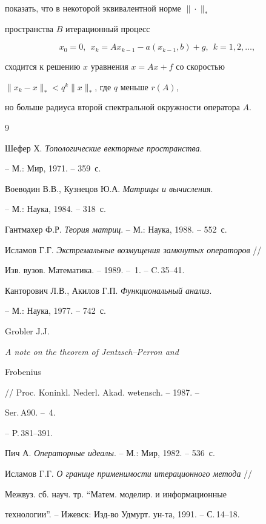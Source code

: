 показать, что в некоторой эквивалентной норме $\|\cdot\|_*$


пространства $B$ итерационный процесс


$$


x_0 = 0,\ \ x_k = Ax_{k-1} - a(x_{k-1},b) + g,\ \ k=1,2,\dotsc,


$$


сходится к решению $x$ уравнения $x = Ax + f$ со скоростью


$\|x_k - x \|_* < q^k \|x\|_*$, где $q$ меньше  $r(A)$, 


но больше радиуса второй спектральной окружности оператора $A$.








\begin{thebibliography}{9}







Шефер Х. {\em Топологические векторные пространства}. 


-- М.: Мир, 1971. -- 359~с.




Воеводин В.В., Кузнецов Ю.А. {\em Матрицы и вычисления}. 


-- М.: Наука, 1984. -- 318~с.




Гантмахер Ф.Р. {\em Теория матриц}. -- М.: Наука, 1988. -- 552~с.




Исламов Г.Г. {\em Экстремальные возмущения замкнутых операторов} // 


Изв. вузов. Математика. -- 1989. -- \No\,1. -- C.\,35--41.




Канторович Л.В., Акилов Г.П. {\em Функциональный анализ}. 


-- М.: Наука, 1977. -- 742~с.




Grobler J.J. {\em A note on the theorem of Jentzsch--Perron and 


Frobenius} // Proc. Koninkl. Nederl. Akad. wetensch. -- 1987. --


Ser.\,A90. -- \No\,4. 


-- P.\,381--391.




Пич А. {\em Операторные идеалы}. -- М.: Мир, 1982. -- 536~с.




Исламов Г.Г. {\em О границе применимости итерационного метода} //


Межвуз. сб. науч. тр. ``Матем. моделир. и информационные


технологии''. -- Ижевск: Изд-во Удмурт. ун-та, 1991. -- С.\,14--18.





\end{thebibliography}





